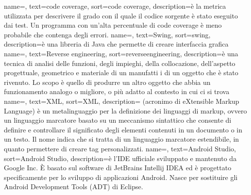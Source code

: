 {
name=,
text=code coverage,
sort=code coverage,
description={è la metrica utilizzata per descrivere il grado con il quale il codice sorgente è stato eseguito dai test.
Un programma con un'alta percentuale di code coverage è meno probabile che contenga degli errori.}
}
{
name=,
text=Swing,
sort=swing,
description={è una libreria di Java che permette di creare interfaccia grafica}
}
{
name=,
text=Reverse engineering,
sort=reverseengineering,
description={è una tecnica di analisi delle funzioni, degli impieghi, della collocazione, dell'aspetto progettuale, geometrico e materiale di un manufatti i di un oggetto che è stato rivenuto.
Lo scopo è quello di produrre un altro oggetto che abbia un funzionamento analogo o migliore, o più adatto al contesto in cui ci si trova}
}
{
name=,
text=XML,
sort=XML,
description={ (acronimo di eXtensible Markup Language) è un metalinguaggio per la definizione dei linguaggi di markup, ovvero un linguaggio marcatore basato su un meccanismo sintattico che consente di definire e controllare il significato degli elementi contenuti in un documento o in un testo.
Il nome indica che si tratta di un linguaggio marcatore estendibile, in quanto permettere di creare tag personalizzati.}
}
{
    name=,
    text=Android Studio,
    sort=Android Studio,
    description={è l'IDE ufficiale sviluppato e mantenuto da Google Inc.
\`{E} basato sul software di JetBrains Intellij IDEA ed è progettato specificamente per lo sviluppo di applicazioni Android.
Nasce per sostituire gli Android Development Tools (ADT) di Eclipse.}
}

